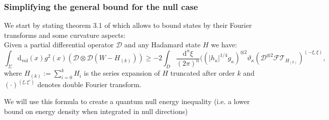 \documentclass[a4paper,11pt]{article}
\numberwithin{equation}{section}
\theoremstyle{definition}
\renewcommand{\d}{{\mathrm{d}}}
\begin{document}
\subsubsection{Simplifying the general bound for the null case}
We start by stating theorem 3.1 of \cite{FourBound} which allows to bound states by their Fourier transforms and some curvature aspects:\\
Given a partial differential operator $\mathcal{D}$ and any Hadamard state $H$ we have:
\begin{equation}\label{3.1}
    \int_\Sigma \d_\mathrm{vol}(x) g^2(x) (\mathcal{D}\otimes\mathcal{D}(W-H_{(k)}))\geq -2\int_D\frac{\d^n\xi}{(2\pi)^n}((|h_\kappa|^{1/4}g_\kappa)^{\otimes 2}\vartheta_\kappa(\mathcal{D}^{\otimes2}\mathcal{FT}_{H_{(k)}})^{(-\xi,\xi)},
\end{equation}
where $H_{(k)}:=\sum_{i=0}^k H_i$ is the series expansion of $H$ truncated after order $k$ and $(\cdot)^{(\xi,\xi')}$ denotes double Fourier transform.

We will use this formula to create a quantum null energy inequality (i.e. a lower bound on energy density when integrated in null directions)
\end{document}
